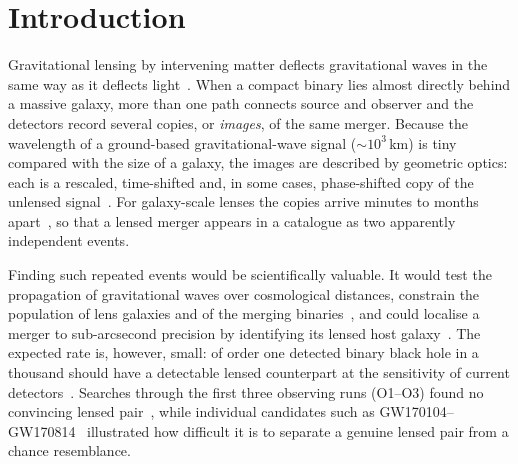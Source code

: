 \documentclass[aps,prd,twocolumn,superscriptaddress,nofootinbib,floatfix]{revtex4-2}
\begin{document}
\maketitle

\section{Introduction}
\label{sec:intro}

Gravitational lensing by intervening matter deflects gravitational waves in the same way as it deflects light~\cite{SchneiderEhlersFalco,NarayanBartelmann,Wang1996,Nakamura1998,TakahashiNakamura2003}.
When a compact binary lies almost directly behind a massive galaxy, more than one path connects source and observer and the detectors record several copies, or \emph{images}, of the same merger.
Because the wavelength of a ground-based gravitational-wave signal ($\sim 10^3$\,km) is tiny compared with the size of a galaxy, the images are described by geometric optics: each is a rescaled, time-shifted and, in some cases, phase-shifted copy of the unlensed signal~\cite{DaiVenumadhav2017,Ezquiaga2021}.
For galaxy-scale lenses the copies arrive minutes to months apart~\cite{Haris2018,Oguri2018}, so that a lensed merger appears in a catalogue as two apparently independent events.

Finding such repeated events would be scientifically valuable.
It would test the propagation of gravitational waves over cosmological distances, constrain the population of lens galaxies and of the merging binaries~\cite{Xu2022}, and could localise a merger to sub-arcsecond precision by identifying its lensed host galaxy~\cite{Hannuksela2020loc}.
The expected rate is, however, small: of order one detected binary black hole in a thousand should have a detectable lensed counterpart at the sensitivity of current detectors~\cite{Ng2018,Li2018,Oguri2018,Wierda2021,Xu2022}.
Searches through the first three observing runs (O1--O3) found no convincing lensed pair~\cite{Hannuksela2019,LiuO2,LVKO3a,LVKO3,Janquart2023followup}, while individual candidates such as GW170104--GW170814~\cite{Dai2020} illustrated how difficult it is to separate a genuine lensed pair from a chance resemblance.
\end{document}
